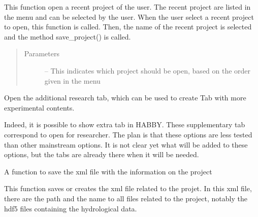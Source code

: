 \documentclass[letterpaper,10pt,english]{sphinxmanual}
\begin{document}
\begin{fulllineitems}
\begin{fulllineitems}
\label{\detokenize{index:src_GUI.Main_windows_1.MainWindows.open_recent_project}}
This function open a recent project of the user. The recent project are listed in the menu and can be
selected by the user. When the user select a recent project to open, this function is called. Then, the name of
the recent project is selected and the method save\_project() is called.
\begin{quote}\begin{description}
\item[{Parameters}] \leavevmode
{} -- This indicates which project should be open, based on the order given in the menu

\end{description}\end{quote}

\end{fulllineitems}


\begin{fulllineitems}
\label{\detokenize{index:src_GUI.Main_windows_1.MainWindows.open_rech}}
Open the additional research tab, which can be used to create Tab with more experimental contents.

Indeed, it is possible to show extra tab in HABBY. These supplementary tab correspond to open for researcher.
The plan is that these options are less tested than other mainstream options. It is not clear yet what
will be added to these options, but the tabs are already there when it will be needed.

\end{fulllineitems}


\begin{fulllineitems}
\label{\detokenize{index:src_GUI.Main_windows_1.MainWindows.save_project}}
A function to save the xml file with the information on the project


This function saves or creates the xml file related to the projet. In this xml file, there are the path and
the name to all files related to the project, notably the hdf5 files containing the hydrological data.


\end{fulllineitems}
\end{fulllineitems}
\end{document}
